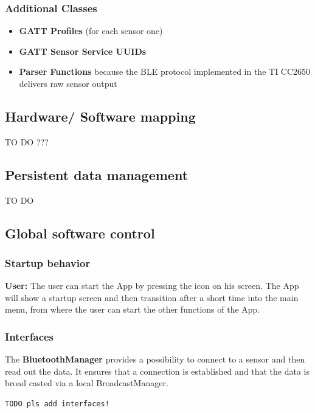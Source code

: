 \subsubsection{Additional Classes}
\begin{itemize}
  \item \textbf{GATT Profiles} (for each sensor one)
  \item \textbf{GATT Sensor Service UUIDs}
  \item \textbf{Parser Functions} because the BLE protocol implemented in the TI CC2650 delivers raw sensor output
\end{itemize}

\subsection{Hardware/ Software mapping}

TO DO ???
\subsection{Persistent data management}
TO DO

\subsection{Global software control}
\subsubsection{Startup behavior}
\textbf{User:} The user can start the App by pressing the icon on his screen.
The App will show a startup screen and then transition after a short time into the main menu, from where
the user can start the other functions of the App.
\subsubsection{Interfaces}
The \textbf{BluetoothManager} provides a possibility to connect to a sensor and then read out
the data. It ensures that a connection is established and that the data is broad casted via a local BroadcastManager.
\\
\begin{lstlisting}
TODO pls add interfaces!
\end{lstlisting}

